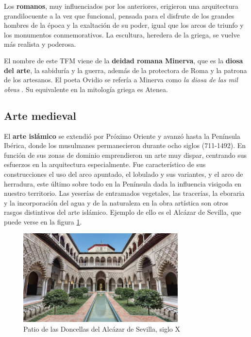 Los \textbf{romanos}, muy influenciados por los anteriores, erigieron una arquitectura grandilocuente a la vez que funcional, pensada para el disfrute de los grandes hombres de la época y la exaltación de su poder, igual que los arcos de triunfo y los monumentos conmemorativos. La escultura, heredera de la griega, se vuelve más realista y poderosa.

El nombre de este \acs{TFM} viene de la \textbf{deidad romana Minerva}, que es la \textbf{diosa del arte}, la sabiduría y la guerra, además de la protectora de Roma y la patrona de los artesanos. El poeta Ovidio se refería a Minerva como \textit{la diosa de las mil obras} \cite{lomb-13}. Su equivalente en la mitología griega es Atenea.

\subsection{Arte medieval}

El \textbf{arte islámico} se extendió por Próximo Oriente y avanzó hasta la Península Ibérica, donde los musulmanes permanecieron durante ocho siglos (711-1492). En función de sus zonas de dominio emprendieron un arte muy dispar, centrando sus esfuerzos en la arquitectura especialmente. Fue característico de sus construcciones el uso del arco apuntado, el lobulado y sus variantes, y el arco de herradura, este último sobre todo en la Península dada la influencia visigoda en nuestro territorio. Las yeserías de entramados vegetales, las tracerías, la eboraria y la incorporación del agua y de la naturaleza en la obra artística son otros rasgos distintivos del arte islámico. Ejemplo de ello es el Alcázar de Sevilla, que puede verse en la figura \ref{fig:patio-doncellas}.

\begin{figure}[!h]
    \begin{center}
        \includegraphics[width=0.75\textwidth]{imagenes/2/patio-doncellas.jpg}
        \caption{Patio de las Doncellas del Alcázar de Sevilla, siglo X}
        \label{fig:patio-doncellas}
    \end{center}
\end{figure}


